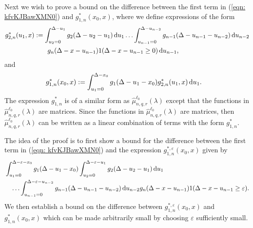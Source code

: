Next we wish to prove a bound on the difference between the first term in (\ref{eqn: kfvKJBawXMN0}) and \(g^*_{1,n}(x_0,x)\), where we define expressions of the form
	\begin{align}
		g^*_{2,n}(u_1,x) &:= \int_{u_2=0}^{\Delta-u_1}g_2(\Delta - u_2 - u_1)\, \mathrm{d} u_1 \dots \nonumber 
            	\int_{u_{n-1}=0}^{\Delta-u_{n-2}} g_{n-1}(\Delta - u_{n-1} - u_{n-2}) \, \mathrm{d} u_{n-2}
            	\\&\qquad{}g_{n}(\Delta - x-u_{n-1})1(\Delta-x-u_{n-1}\geq0)\, \mathrm{d} u_{n-1},
	\end{align}
	and
	\begin{align}
		g^*_{1,n}(x_0,x) &:= \int_{u_1=0}^{\Delta-x_0}g_1(\Delta - u_1 - x_0)g^*_{2,n}(u_1,x)\, \mathrm{d} u_1.
	\end{align}
	The expression \(g^*_{1,n}\) is of a similar form as \(\widehat \mu^{\ell_0}_{n,q,r}(\lambda)\) except that the functions in \(\widehat \mu^{\ell_0}_{n,q,r}(\lambda)\) are matrices. Since the functions in \(\widehat \mu^{\ell_0}_{n,q,r}(\lambda)\) are matrices, then \(\widehat \mu^{\ell_0}_{n,q,r}(\lambda)\) can be written as a linear combination of terms with the form \(g^*_{1,n}\). 

The idea of the proof is to first show a bound for the difference between the first term in (\ref{eqn: kfvKJBawXMN0}) and the expression \(g^{*,\varepsilon}_{1,n}(x_0,x)\) given by
	\begin{align}
		&\int_{u_1=0}^{\Delta-\varepsilon-x_0}g_1(\Delta - u_1 - x_0)
		\int_{u_2=0}^{\Delta-\varepsilon-u_1}g_2(\Delta - u_2 - u_1)\, \mathrm{d} u_1  \nonumber 
		\\&\quad\hdots 
            	\int_{u_{n-1}=0}^{\Delta-\varepsilon-u_{n-2}} g_{n-1}(\Delta - u_{n-1} - u_{n-2}) \, \mathrm{d} u_{n-2}
            	g_{n}(\Delta-x-u_{n-1}) 
		1(\Delta-x-u_{n-1}\geq\varepsilon).
	\end{align}
	We then establish a bound on the difference between \(g^{*,\varepsilon}_{1,n}(x_0,x)\) and \(g^{*}_{1,n}(x_0,x)\) which can be made arbitrarily small by choosing \(\varepsilon\) sufficiently small. 

